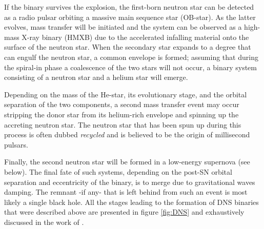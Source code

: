 \documentclass[../../main/thesis_msc.tex]{subfiles}
\begin{document}
				If the binary survives the explosion, the first-born neutron star can be detected as a radio pulsar orbiting a massive main sequence star (OB-star). As the latter evolves, mass transfer will be initiated and the system can be observed as a high-mass X-ray binary (HMXB) due to the accelerated infalling material onto the surface of the neutron star. When the secondary star expands to a degree that can engulf the neutron star, a common envelope is formed; assuming that during the spiral-in phase a coalescence of the two stars will not occur, a binary system consisting of a neutron star and a helium star will emerge.
				
				Depending on the mass of the He-star, its evolutionary stage, and the orbital separation of the two components, a second mass transfer event may occur stripping the donor star from its helium-rich envelope and spinning up the accreting neutron star. The neutron star that has been spun up during this process is often dubbed \emph{recycled} and is believed to be the origin of millisecond pulsars.
				
				Finally, the second neutron star will be formed in a low-energy supernova (see below). The final fate of such systems, depending on the post-SN orbital separation and eccentricity of the binary, is to merge due to gravitational waves damping. The remnant -if any- that is left behind from such an event is most likely a single black hole. All the stages leading to the formation of DNS binaries that were described above are presented in figure \ref{fig:DNS} and exhaustively discussed in the work of \cite{Tauris2017}.
				
\end{document}

